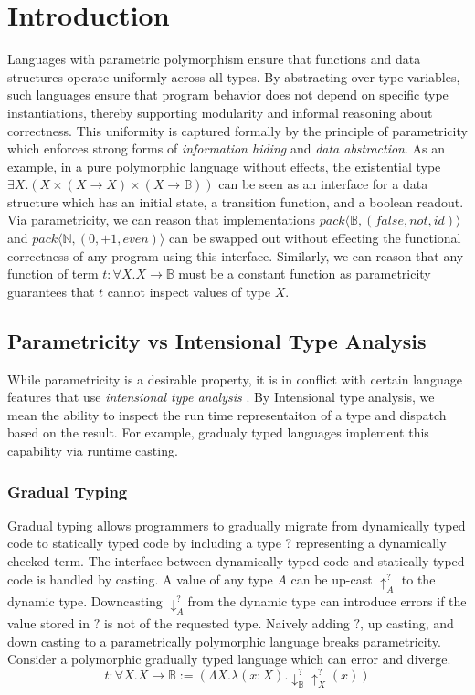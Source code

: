 \documentclass[acmsmall]{acmart}
\begin{document}
\section{Introduction}
Languages with parametric polymorphism ensure that functions and data structures operate uniformly across all types. By abstracting over type variables, such languages ensure that program behavior does not depend on specific type instantiations, thereby supporting modularity and informal reasoning about correctness\cite{Wadler}. This uniformity is captured formally by the principle of parametricity\cite{Reynolds1983TypesAA}\cite{HERMIDA2014149} which enforces strong forms of \emph{information hiding} and \emph{data abstraction}\cite{AbstractExistentials}. As an example, in a pure polymorphic language without effects, the existential type $\exists X.(X \times (X \to X) \times (X \to \mathbb{B}))$ can be seen as an interface for a data structure which has an initial state, a transition function, and a boolean readout. Via parametricity, we can reason that implementations $pack\langle \mathbb{B}, (false,not,id)\rangle$ and $pack\langle \mathbb{N},(0,+1,even)\rangle$ can be swapped out without effecting the functional correctness of any program using this interface. Similarly, we can reason that any function of term $t:\forall X. X \to \mathbb{B}$ must be a constant function as parametricity guarantees that $t$ cannot inspect values of type $X$.



\subsection{Parametricity vs Intensional Type Analysis}
While parametricity is a desirable property, it is in conflict with certain language features that use \emph{intensional type analysis} \cite{IntTypeAnalysis}. By Intensional type analysis, we mean the ability to inspect the run time representaiton of a type and dispatch based on the result. For example, gradualy typed languages implement this capability via runtime casting\cite{GradParam}.


\subsubsection{Gradual Typing}
Gradual typing allows programmers to gradually migrate from dynamically typed code to statically typed code by including a type $?$ representing a dynamically checked term. 
The interface between dynamically typed code and statically typed code is handled by casting.
A value of any type $A$ can be up-cast $\uparrow_A^?$ to the dynamic type.
Downcasting $\downarrow_A^?$from the dynamic type can introduce errors if the value stored in $?$ is not of the requested type.
Naively adding $?$, up casting, and down casting to a parametrically polymorphic language breaks parametricity. 
Consider a polymorphic gradually typed language which can error and diverge.
$$t : \forall X. X \rightarrow \mathbb{B}:= (\Lambda X. \lambda (x : X). \downarrow_\mathbb{B}^?\uparrow_X^?(x))$$
\end{document}
